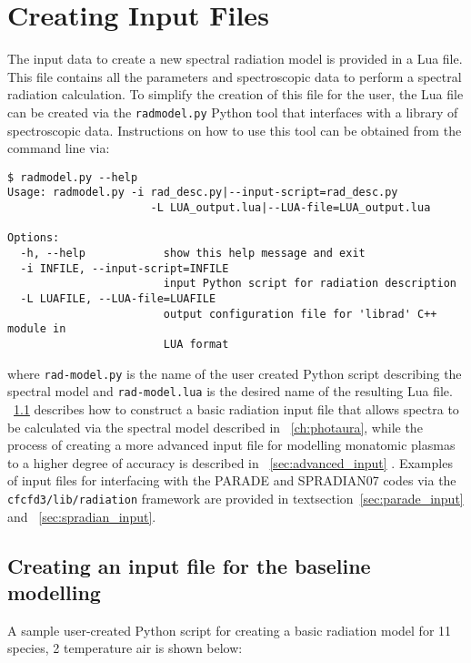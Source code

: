 \chapter{Creating Input Files}
\label{chap:input}

The input data to create a new spectral radiation model is provided in a Lua file.
This file contains all the parameters and spectroscopic data to perform a spectral radiation calculation.
To simplify the creation of this file for the user, the Lua file can be created via the \texttt{radmodel.py} Python tool that interfaces with a library of spectroscopic data.
Instructions on how to use this tool can be obtained from the command line via:

\begin{lstlisting}[basicstyle=\ttfamily\small]
$ radmodel.py --help
Usage: radmodel.py -i rad_desc.py|--input-script=rad_desc.py
                      -L LUA_output.lua|--LUA-file=LUA_output.lua

Options:
  -h, --help            show this help message and exit
  -i INFILE, --input-script=INFILE
                        input Python script for radiation description
  -L LUAFILE, --LUA-file=LUAFILE
                        output configuration file for 'librad' C++ module in
                        LUA format
\end{lstlisting}

\noindent where \texttt{rad-model.py} is the name of the user created Python script describing the spectral model and \texttt{rad-model.lua} is the desired name of the resulting Lua file.
\textsection~\ref{sec:basic_input} describes how to construct a basic radiation input file that allows spectra to be calculated via the spectral model described in \textsection~\ref{ch:photaura}, while the process of creating a more advanced input file for modelling monatomic plasmas to a higher degree of accuracy is described in \textsection~\ref{sec:advanced_input} .
Examples of input files for interfacing with the PARADE and SPRADIAN07 codes via the \texttt{cfcfd3/lib/radiation} framework are provided in textsection~\ref{sec:parade_input} and \textsection~\ref{sec:spradian_input}.

\section{Creating an input file for the baseline modelling}
\label{sec:basic_input}

A sample user-created Python script for creating a basic radiation model for 11 species, 2 temperature air is shown below:

